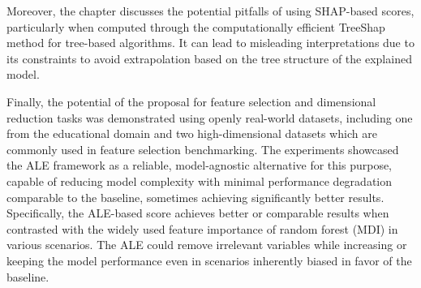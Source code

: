 Moreover, the chapter discusses the potential pitfalls of using \gls{SHAP}-based scores, particularly when computed through the computationally efficient TreeShap method for tree-based algorithms. It can lead to misleading interpretations due to its constraints to avoid extrapolation based on the tree structure of the explained model.

Finally, the potential of the proposal for feature selection and dimensional reduction tasks was demonstrated using openly real-world datasets, including one from the educational domain and two high-dimensional datasets which are commonly used in feature selection benchmarking. The experiments showcased the \gls{ALE} framework as a reliable, model-agnostic alternative for this purpose, capable of reducing model complexity with minimal performance degradation comparable to the baseline, sometimes achieving significantly better results. Specifically, the ALE-based score achieves better or comparable results when contrasted with the widely used feature importance of random forest (\gls{MDI}) in various scenarios. The ALE could remove irrelevant variables while increasing or keeping the model performance even in scenarios inherently biased in favor of the baseline.
